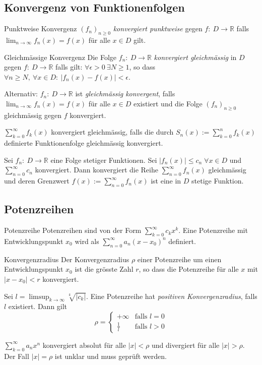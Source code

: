 \documentclass[a4paper,10pt]{article}
\def\limn{\lim_{n\to \infty}}
\def\sumn{\sum_{n=0}^\infty}
\def\R{\mathbb{R}}
\begin{document}
\subsection{Konvergenz von Funktionenfolgen}

\begin{mainbox}{Punktweise Konvergenz}
  $(f_n)_{n \geq 0}$ \emph{konvergiert punktweise} gegen $f: \: D \to \R$ falls $\limn f_n(x) = f(x)$ für alle $x \in D$ gilt.
\end{mainbox}

\begin{mainbox}{Gleichmässige Konvergenz}
 Die Folge $f_n : \: D \to \R$ \emph{konvergiert gleichmässig} in $D$ gegen $f: \: D \to \R$ falls gilt: $\forall \epsilon > 0 \ \exists N \ge 1$, so dass $\forall n \ge N, \ \forall x \in D: \: | f_n(x) - f(x) | < \epsilon$.
 
 Alternativ: $f_n: \: D \to \R$ ist \emph{gleichmässig konvergent}, falls $\limn f_n(x) = f(x)$ für alle $x\in D$ existiert und die Folge $(f_n)_{n \geq 0}$ gleichmässig gegen $f$ konvergiert.
\end{mainbox}
$\sum_{k=0}^\infty f_k(x)$ konvergiert gleichmässig, falls die durch $S_n(x) := \sum_{k=0}^n f_k(x)$ definierte Funktionenfolge gleichmässig konvergiert.

\begin{subbox}{}
 Sei $f_n: \: D \to \R$ eine Folge stetiger Funktionen. Sei $|f_n(x)| \le c_n \; \forall x \in D$ und $\sum_{n=0}^\infty c_n$ konvergiert. Dann konvergiert die Reihe $\sum_{n=0}^\infty f_n(x)$ gleichmässig und deren Grenzwert $f(x) := \sumn{f_n(x)}$ ist eine in $D$ stetige Funktion.
\end{subbox}

\subsection{Potenzreihen}
\begin{subbox}{Potenzreihe}
 Potenzreihen sind von der Form $\sum_{k=0}^\infty c_k x^k$. Eine Potenzreihe mit Entwicklungspunkt $x_0$ wird als $\sum_{n=0}^\infty a_n(x-x_0)^n$ definiert.
\end{subbox}

\begin{mainbox}{Konvergenzradius}
 Der Konvergenzradius $\rho$ einer Potenzreihe um einen Entwicklungspunkt $x_0$ ist die grösste Zahl $r$, so dass die Potenzreihe für alle $x$ mit $|x - x_0| < r$ konvergiert.
 
 Sei $l = \limsup_{k \to \infty} \sqrt[k]{|c_k|}$. Eine Potenzreihe hat \emph{positiven Konvergenzradius}, falls $l$ existiert. Dann gilt
 \[ \rho = \begin{cases}
     +\infty & \text{falls } l = 0 \\
     \frac{1}{l} & \text{falls } l > 0
 \end{cases} \]
\end{mainbox}
$\sum_{k=0}^\infty a_n x^n$ konvergiert absolut für alle $|x| < \rho$ und divergiert für alle $|x| > \rho$. Der Fall $|x| = \rho$ ist unklar und muss geprüft werden.
\end{document}
